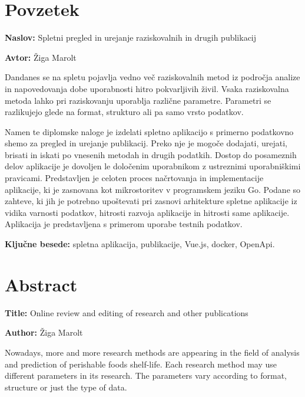 \documentclass[a4paper, 12pt]{book}
\newcommand{\ttitle}{Spletni pregled in urejanje raziskovalnih in drugih publikacij}
\newcommand{\ttitleEn}{Online review and editing of research and other publications}
\newcommand{\tauthor}{Žiga Marolt}
\newcommand{\tkeywords}{spletna aplikacija, publikacije, Vue.js, docker, OpenApi}
\newcommand{\clearemptydoublepage}{\newpage{\pagestyle{empty}\cleardoublepage}}
\begin{document}
\clearemptydoublepage

\chapter*{Povzetek}

\noindent\textbf{Naslov:} \ttitle
\bigskip

\noindent\textbf{Avtor:} \tauthor
\bigskip

\noindent Dandanes se na spletu pojavlja vedno več raziskovalnih metod iz področja analize in napovedovanja dobe uporabnosti hitro pokvarljivih živil. Vsaka raziskovalna metoda lahko pri raziskovanju uporablja različne parametre. Parametri se razlikujejo glede na format, strukturo ali pa samo vrsto podatkov. 

Namen te diplomske naloge je izdelati spletno aplikacijo s primerno podatkovno shemo za pregled in urejanje publikacij. Preko nje je mogoče dodajati, urejati, brisati in iskati po vnesenih metodah in drugih podatkih. Dostop do posameznih delov aplikacije je dovoljen le določenim uporabnikom z ustreznimi uporabniškimi pravicami. Predstavljen je celoten proces načrtovanja in implementacije aplikacije, ki je zasnovana kot mikrostoritev v programskem jeziku Go. Podane so zahteve, ki jih je potrebno upoštevati pri zasnovi arhitekture spletne aplikacije iz vidika varnosti podatkov, hitrosti razvoja aplikacije in hitrosti same aplikacije. Aplikacija je predstavljena s primerom uporabe testnih podatkov.

\bigskip

\noindent\textbf{Ključne besede:} \tkeywords.
\clearemptydoublepage

\chapter*{Abstract}

\noindent\textbf{Title:} \ttitleEn
\bigskip

\noindent\textbf{Author:} \tauthor
\bigskip

\noindent Nowadays, more and more research methods are appearing in the field of analysis and prediction of perishable foods shelf-life. Each research method may use different parameters in its research. The parameters vary according to format, structure or just the type of data.
\end{document}
